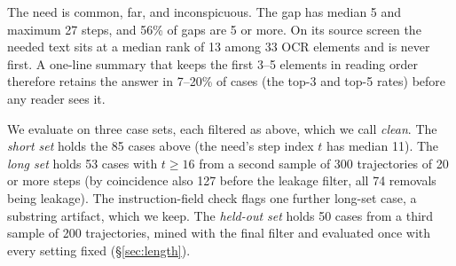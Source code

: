 The need is common, far, and inconspicuous. The gap has median 5 and maximum 27 steps, and 56\% of gaps are 5 or more. On its source screen the needed text sits at a median rank of 13 among 33 OCR elements and is never first. A one-line summary that keeps the first 3--5 elements in reading order therefore retains the answer in 7--20\% of cases (the top-3 and top-5 rates) before any reader sees it.

We evaluate on three case sets, each filtered as above, which we call \emph{clean}. The \emph{short set} holds the 85 cases above (the need's step index $t$ has median 11). The \emph{long set} holds 53 cases with $t\ge16$ from a second sample of 300 trajectories of 20 or more steps (by coincidence also 127 before the leakage filter, all 74 removals being leakage). The instruction-field check flags one further long-set case, a substring artifact, which we keep. The \emph{held-out set} holds 50 cases from a third sample of 200 trajectories, mined with the final filter and evaluated once with every setting fixed (\S\ref{sec:length}).
